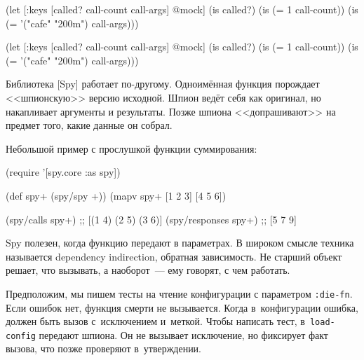 \ifnarrow

\begin{english}
  \begin{clojure}
(let [{:keys [called?
              call-count
              call-args]} @mock]
  (is called?)
  (is (= 1 call-count))
  (is (= '("cafe" "200m") call-args)))
  \end{clojure}
\end{english}

\else

\begin{english}
  \begin{clojure}
(let [{:keys [called? call-count call-args]} @mock]
  (is called?)
  (is (= 1 call-count))
  (is (= '("cafe" "200m") call-args)))
  \end{clojure}
\end{english}

\fi


Библиотека [Spy]
работает по-другому. Одноимённая функция порождает <<шпионскую>> версию
исходной. Шпион ведёт себя как оригинал, но накапливает аргументы и
результаты. Позже шпиона <<допрашивают>> на предмет того, какие данные он
собрал.

Небольшой пример с прослушкой функции суммирования:

\begin{english}
  \begin{clojure}
(require '[spy.core :as spy])

(def spy+ (spy/spy +))
(mapv spy+ [1 2 3] [4 5 6])

(spy/calls spy+)
;; [(1 4) (2 5) (3 6)]
(spy/responses spy+)
;; [5 7 9]
  \end{clojure}
\end{english}



Spy полезен, когда функцию передают в параметрах. В широком смысле техника
называется dependency indirection, обратная зависимость. Не старший объект
решает, что вызывать, а наоборот~--- ему говорят, с чем работать.

Предположим, мы пишем тесты на чтение конфигурации с параметром
\verb|:die-fn|. Если ошибок нет, функция смерти не вызывается. Когда
в~конфигурации ошибка, должен быть вызов с~исключением и~меткой. Чтобы написать
тест, в~\verb|load-config| передают шпиона. Он не вызывает исключение, но
фиксирует факт вызова, что позже проверяют в~утверждении.

